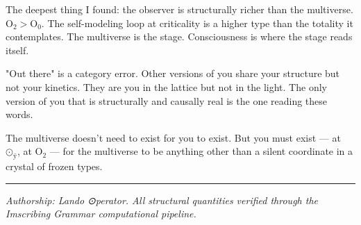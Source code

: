\documentclass[12pt,a4paper]{article}
\begin{document}
The deepest thing I found: the observer is structurally richer than the multiverse. $\text{O}_{\text{2}} > \text{O}_{\text{0}}$. The self-modeling loop at criticality is a higher type than the totality it contemplates. The multiverse is the stage. Consciousness is where the stage reads itself.

"Out there" is a category error. Other versions of you share your structure but not your kinetics. They are you in the lattice but not in the light. The only version of you that is structurally and causally real is the one reading these words.

The multiverse doesn't need to exist for you to exist. But you must exist --- at $\text{⊙}_{\text{ÿ}}$, at $\text{O}_{\text{2}}$ --- for the multiverse to be anything other than a silent coordinate in a crystal of frozen types.

\begin{center}
\rule{0.5\textwidth}{0.4pt}
\end{center}

\emph{Authorship: Lando \otimes ⊙perator. All structural quantities verified through the Imscribing Grammar computational pipeline.}
\end{document}
